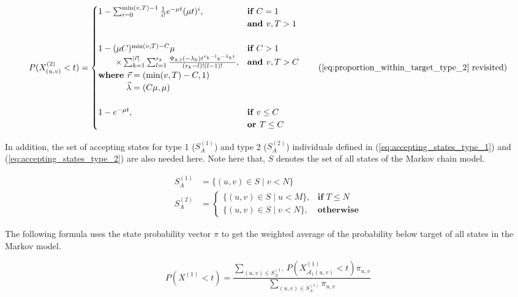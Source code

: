 \begin{equation}
    P(X_{(u,v)}^{(2)} < t) = 
    \begin{cases}
        1 - \sum_{i=0}^{\min(v,T)-1} \frac{1}{i!} e^{-\mu t} (\mu t)^i,  
            & \textbf{if } C = 1 \\ 
            & \textbf{and } v, T > 1 \\
            & \\
        1 - (\mu C) ^ {\min(v,T) - C} \mu  & \textbf{if } C > 1 \\
        \qquad \times \sum_{k=1}^{\mid \vec{r} \mid} \sum_{l=1}^{r_k} 
            \frac{\Psi_{k,l}(-\lambda_k)t^{r_k - l} 
            e^{-\lambda_k t}}{(r_k - l)! (l - 1)!}, 
            & \textbf{and } v, T  > C \\
        \textbf{where } \vec{r}=(\min(v, T) - C, 1) \\
        \hspace{1.15cm} \vec{\lambda}=(C \mu, \mu) \\
        & \\
        1 - e^{-\mu t}, & \textbf{if } v \leq C \\ 
        & \textbf{or } T \leq C \\
    \end{cases}
    \tag{\ref{eq:proportion_within_target_type_2} revisited}
\end{equation}


In addition, the set of accepting states for type 1 (\(S_A^{(1)}\)) and type 2 
(\(S_A^{(2)}\)) individuals defined in (\ref{eq:accepting_states_type_1}) and 
(\ref{eq:accepting_states_type_2}) are also needed here.
Note here that, \(S\) denotes the set of all states of the Markov chain model. 

\begin{align*}
    S_A^{(1)} &= \{(u, v) \in S \; | \; v < N \} \\
    S_A^{(2)} &=
    \begin{cases}
        \{(u, v) \in S \; | \; u < M \}, & \textbf{if } T \leq N \\
        \{(u, v) \in S \; | \; v < N \}, & \textbf{otherwise}
    \end{cases}
\end{align*}

The following formula uses the state probability vector \(\pi\) to get the 
weighted average of the probability below target of all states in the Markov
model.

\begin{equation}
    P(X^{(1)} < t) = \frac{\sum_{(u,v) \in S_A^{(1)}} 
    P(X_{\mathcal{A}_1(u,v)}^{(1)} < t) 
    \pi_{u,v} }{\sum_{(u,v) \in S_A^{(1)}} \pi_{u,v}}
\end{equation}

